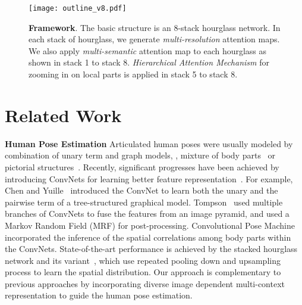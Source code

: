 \documentclass[10pt,twocolumn,letterpaper]{article}
\newcommand{\smalltitle}[1]{\vspace{0.2em}\noindent \textbf{{#1}}}
\begin{document}
\begin{figure*}[t]
\begin{center}
   \texttt{[image: outline\_v8.pdf]}
\end{center}
	\vspace{-1em}
   \caption{\small \textbf{Framework}. 
   The basic structure is an 8-stack hourglass network. 
In each stack of hourglass, we generate \textit{multi-resolution} attention maps. 
   We also apply \textit{multi-semantic} attention map to each hourglass as shown in stack 1 to stack 8.
   \textit{Hierarchical Attention Mechanism} for zooming in on local parts is applied in stack 5 to stack 8.}
   \vspace{-1.5em}
\label{fig:overview}
\end{figure*}



\section{Related Work}

\smalltitle{Human Pose Estimation} 
Articulated human poses were usually modeled by combination of unary term and graph models, \eg, mixture of body parts~\cite{yang2011articulated,chen2014articulated,ouyang2014multi} or pictorial structures~\cite{pishchulin2013poselet}. 
Recently, significant progresses have been achieved by introducing ConvNets for learning better feature representation~\cite{toshev2014deeppose,tompson2014joint,tompson2015efficient,chen2014articulated,wei2016convolutional,yang2016end,chu2016structure,chu2016crf,pishchulin2016deepcut,newell2016stacked}. 
For example, Chen and Yuille~\cite{chen2014articulated} introduced the ConvNet to learn both the unary and the pairwise term of a tree-structured graphical model. 
Tompson~\etal \cite{tompson2015efficient} used multiple branches of ConvNets to fuse the features from an image pyramid, and used a Markov Random Field (MRF) for post-processing. 
Convolutional Pose Machine~\cite{wei2016convolutional} incorporated the inference of the spatial correlations among body parts within the ConvNets.  State-of-the-art performance is achieved by the stacked hourglass network \cite{newell2016stacked} and its variant~\cite{bulat2016human}, which use repeated pooling down and upsampling process to learn the spatial distribution. 
Our approach is complementary to previous approaches by incorporating diverse image dependent multi-context representation to guide the human pose estimation.
\end{document}
